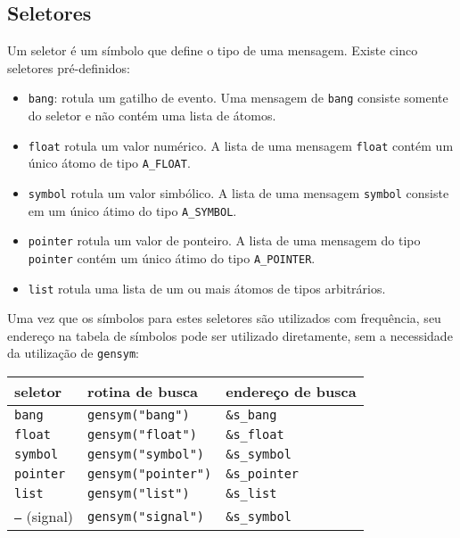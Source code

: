 \subsection{Seletores}

Um seletor é um símbolo que define o tipo de uma mensagem. Existe cinco
seletores pré-definidos:

\begin{itemize}
  \item \texttt{bang}: rotula um gatilho de evento. Uma mensagem de
    \texttt{bang} consiste somente do seletor e não contém uma lista de átomos.
  \item \texttt{float} rotula um valor numérico. A lista de uma mensagem
    \texttt{float} contém um único átomo de tipo \texttt{A\_FLOAT}.
  \item \texttt{symbol} rotula um valor simbólico. A lista de uma mensagem
    \texttt{symbol} consiste em um único átimo do tipo \texttt{A\_SYMBOL}.
  \item \texttt{pointer} rotula um valor de ponteiro. A lista de uma mensagem do
    tipo \texttt{pointer} contém um único átimo do tipo \texttt{A\_POINTER}.
  \item \texttt{list} rotula uma lista de um ou mais átomos de tipos arbitrários.
\end{itemize}

Uma vez que os símbolos para estes seletores são utilizados com frequência,
seu endereço na tabela de símbolos pode ser utilizado diretamente, sem a
necessidade da utilização de \texttt{gensym}:

\begin{center}
\begin{tabular}{|l|l|l|}
\hline
  seletor & rotina de busca & endereço de busca \\
\hline
  \texttt{bang} & \texttt{gensym("bang")} & \texttt{\&s\_bang} \\
  \texttt{float} & \texttt{gensym("float")} & \texttt{\&s\_float} \\
  \texttt{symbol} & \texttt{gensym("symbol")} & \texttt{\&s\_symbol} \\
  \texttt{pointer} & \texttt{gensym("pointer")} & \texttt{\&s\_pointer} \\
  \texttt{list} & \texttt{gensym("list")} & \texttt{\&s\_list} \\
  \texttt{--}  (signal) & \texttt{gensym("signal")} & \texttt{\&s\_symbol} \\
\hline
\end{tabular}
\end{center}

